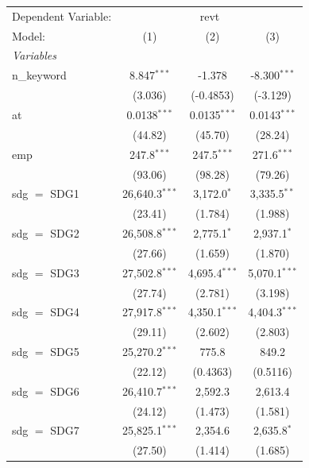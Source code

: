 
\begingroup
\centering
\begin{tabular}{lccc}
   \tabularnewline \midrule \midrule
   Dependent Variable: & \multicolumn{3}{c}{revt}\\
   Model:        & (1)              & (2)             & (3)\\  
   \midrule
   \emph{Variables}\\
   n\_keyword    & 8.847$^{***}$    & -1.378          & -8.300$^{***}$\\   
                 & (3.036)          & (-0.4853)       & (-3.129)\\   
   at            & 0.0138$^{***}$   & 0.0135$^{***}$  & 0.0143$^{***}$\\   
                 & (44.82)          & (45.70)         & (28.24)\\   
   emp           & 247.8$^{***}$    & 247.5$^{***}$   & 271.6$^{***}$\\   
                 & (93.06)          & (98.28)         & (79.26)\\   
   sdg $=$ SDG1  & 26,640.3$^{***}$ & 3,172.0$^{*}$   & 3,335.5$^{**}$\\   
                 & (23.41)          & (1.784)         & (1.988)\\   
   sdg $=$ SDG2  & 26,508.8$^{***}$ & 2,775.1$^{*}$   & 2,937.1$^{*}$\\   
                 & (27.66)          & (1.659)         & (1.870)\\   
   sdg $=$ SDG3  & 27,502.8$^{***}$ & 4,695.4$^{***}$ & 5,070.1$^{***}$\\   
                 & (27.74)          & (2.781)         & (3.198)\\   
   sdg $=$ SDG4  & 27,917.8$^{***}$ & 4,350.1$^{***}$ & 4,404.3$^{***}$\\   
                 & (29.11)          & (2.602)         & (2.803)\\   
   sdg $=$ SDG5  & 25,270.2$^{***}$ & 775.8           & 849.2\\   
                 & (22.12)          & (0.4363)        & (0.5116)\\   
   sdg $=$ SDG6  & 26,410.7$^{***}$ & 2,592.3         & 2,613.4\\   
                 & (24.12)          & (1.473)         & (1.581)\\   
   sdg $=$ SDG7  & 25,825.1$^{***}$ & 2,354.6         & 2,635.8$^{*}$\\   
                 & (27.50)          & (1.414)         & (1.685)\\   

\end{tabular}
